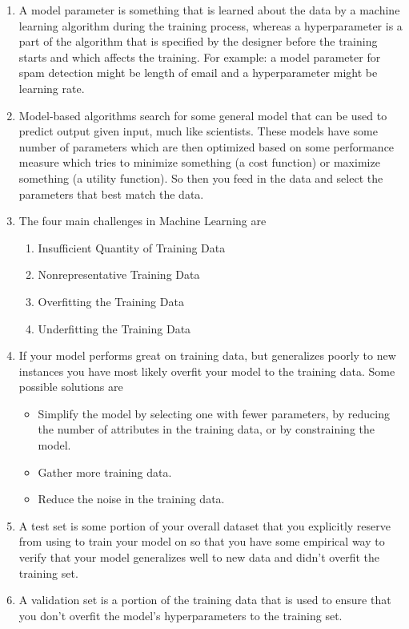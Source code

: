 \documentclass[12pt]{article}
\begin{document}
\begin{enumerate}[label=\arabic*]
  \item A model parameter is something that is learned about the data by a machine learning algorithm during the training process, whereas
        a hyperparameter is a part of the algorithm that is specified by the designer before the training starts and which affects the training.
        For example: a model parameter for spam detection might be length of email and a hyperparameter might be learning rate.
  \item Model-based algorithms search for some general model that can be used to predict output given input, much like scientists.
        These models have some number of parameters which are then optimized based on some performance measure which tries to minimize something
        (a cost function) or maximize something (a utility function). So then you feed in the data and select the parameters that best match the data.
  \item The four main challenges in Machine Learning are
        \begin{enumerate}[label=\arabic*]
          \item Insufficient Quantity of Training Data
          \item Nonrepresentative Training Data
          \item Overfitting the Training Data
          \item Underfitting the Training Data
        \end{enumerate}
  \item If your model performs great on training data, but generalizes poorly to new instances you have most likely overfit your model to the training data.
        Some possible solutions are
        \begin{itemize}
          \item Simplify the model by selecting one with fewer parameters, by reducing the number of attributes in the training data, or by constraining the model.
          \item Gather more training data.
          \item Reduce the noise in the training data.
        \end{itemize}
  \item A test set is some portion of your overall dataset that you explicitly reserve from using to train your model on so that you have some
        empirical way to verify that your model generalizes well to new data and didn't overfit the training set.
  \item A validation set is a portion of the training data that is used to ensure that you don't overfit the model's hyperparameters to the training set.

\end{enumerate}
\end{document}
